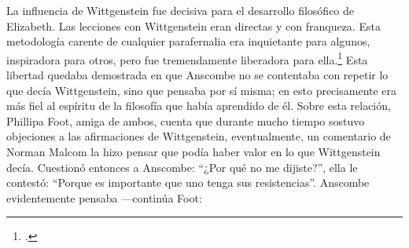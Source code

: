     La influencia de Wittgenstein fue decisiva para el desarrollo filosófico de
    Elizabeth. Las lecciones con Wittgenstein eran directas y con franqueza. Esta
    metodología carente de cualquier parafernalia era inquietante para algunos,
    inspiradora para otros, pero fue tremendamente liberadora para
    ella.\footcite[loc 9853 Chapter 4, Section 24, \S5]{monk} Esta libertad
    quedaba demostrada en que Anscombe no se contentaba con repetir lo que decía
    Wittgenstein, sino que pensaba por sí misma; en esto precisamente era más fiel
    al espíritu de la filosofía que había aprendido de él. Sobre esta relación,
    Phillipa Foot, amiga de ambos, cuenta que durante mucho tiempo sostuvo
    objeciones a las afirmaciones de Wittgenstein, eventualmente, un comentario de
    Norman Malcom la hizo pensar que podía haber valor en lo que Wittgenstein decía.
    Cuestionó entonces a Anscombe: 
    ``¿Por qué no me dijiste?'', ella le contestó: ``Porque es importante que uno
    tenga sus resistencias''. Anscombe evidentemente pensaba ---continúa Foot: 






